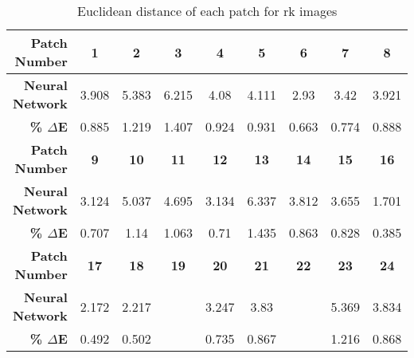 \begin{table}[H]
  \caption{Euclidean distance of each patch for rk images }
  \begin{center}
    \begin{tabularx}{\textwidth}{r c c c c c c c c}
    \toprule
        \textbf{Patch Number} & \textbf{1} & \textbf{2} & \textbf{3} & \textbf{4} & \textbf{5} & \textbf{6} & \textbf{7} & \textbf{8}\\ \midrule 
        \textbf{Neural Network} &3.908 &5.383 &6.215 &4.08 &4.111 &2.93 &3.42 &3.921\\ 
        \textbf{\textbf{\% $\Delta$E}} &0.885 &1.219 &1.407 &0.924 &0.931 &0.663 &0.774 &0.888\\ \midrule 
        \textbf{Patch Number} & \textbf{9} & \textbf{10} & \textbf{11} & \textbf{12} & \textbf{13} & \textbf{14} & \textbf{15} & \textbf{16}\\ \midrule 
        \textbf{Neural Network} &3.124 &5.037 &4.695 &3.134 &6.337 &3.812 &3.655 &1.701\\ 
        \textbf{\textbf{\% $\Delta$E}} &0.707 &1.14 &1.063 &0.71 &1.435 &0.863 &0.828 &0.385\\ \midrule 
        \textbf{Patch Number} & \textbf{17} & \textbf{18} & \textbf{19} & \textbf{20} & \textbf{21} & \textbf{22} & \textbf{23} & \textbf{24}\\ \midrule 
        \textbf{Neural Network} &2.172 &2.217 &\cellcolor{colorgreen}{1.098} &3.247 &3.83 &\cellcolor{colorred}{6.565} &5.369 &3.834\\ 
        \textbf{\textbf{\% $\Delta$E}} &0.492 &0.502 &\cellcolor{colorgreen}{0.249} &0.735 &0.867 &\cellcolor{colorred}{1.486} &1.216 &0.868\\ \midrule 
    \bottomrule
    \end{tabularx}
  \end{center}
\end{table}
